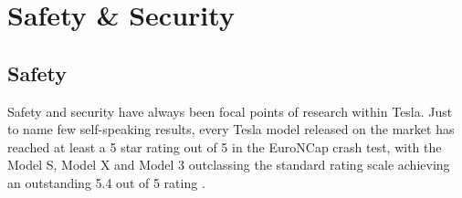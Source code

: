 \documentclass{article} %
\begin{document}




\section{Safety \& Security} %
\subsection{Safety}

Safety and security have always been focal points of research within Tesla. Just to name few self-speaking results, every Tesla model released on the market has reached at least a 5 star rating out of 5 in the EuroNCap crash test, with the Model S, Model X and Model 3 outclassing the standard rating scale achieving an outstanding 5.4 out of 5 rating \cite{tesla_euroncap}.
\end{document}
